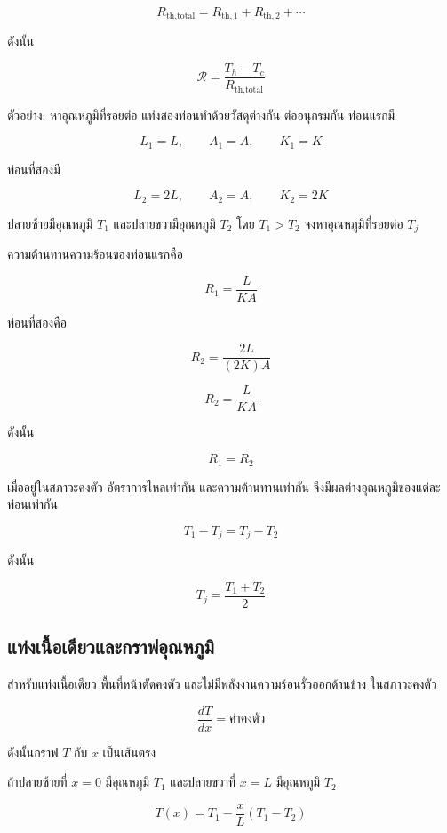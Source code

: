 \[
R_{\text{th,total}}
=
R_{\text{th},1}
+
R_{\text{th},2}
+\cdots
\]

ดังนั้น

\[
\mathcal{R}
=
\frac{T_h-T_c}{R_{\text{th,total}}}
\]

\begin{examplebox}{ตัวอย่าง: หาอุณหภูมิที่รอยต่อ}
แท่งสองท่อนทำด้วยวัสดุต่างกัน ต่ออนุกรมกัน ท่อนแรกมี

\[
L_1=L,\qquad A_1=A,\qquad K_1=K
\]

ท่อนที่สองมี

\[
L_2=2L,\qquad A_2=A,\qquad K_2=2K
\]

ปลายซ้ายมีอุณหภูมิ $T_1$ และปลายขวามีอุณหภูมิ $T_2$ โดย $T_1>T_2$ จงหาอุณหภูมิที่รอยต่อ $T_j$

ความต้านทานความร้อนของท่อนแรกคือ

\[
R_1=\frac{L}{KA}
\]

ท่อนที่สองคือ

\[
R_2=\frac{2L}{(2K)A}
\]

\[
R_2=\frac{L}{KA}
\]

ดังนั้น

\[
R_1=R_2
\]

เมื่ออยู่ในสภาวะคงตัว อัตราการไหลเท่ากัน และความต้านทานเท่ากัน จึงมีผลต่างอุณหภูมิของแต่ละท่อนเท่ากัน

\[
T_1-T_j=T_j-T_2
\]

ดังนั้น

\[
\boxed{T_j=\frac{T_1+T_2}{2}}
\]
\end{examplebox}

\subsection{แท่งเนื้อเดียวและกราฟอุณหภูมิ}

สำหรับแท่งเนื้อเดียว พื้นที่หน้าตัดคงตัว และไม่มีพลังงานความร้อนรั่วออกด้านข้าง ในสภาวะคงตัว

\[
\frac{dT}{dx}=\text{ค่าคงตัว}
\]

ดังนั้นกราฟ $T$ กับ $x$ เป็นเส้นตรง

ถ้าปลายซ้ายที่ $x=0$ มีอุณหภูมิ $T_1$ และปลายขวาที่ $x=L$ มีอุณหภูมิ $T_2$

\[
\boxed{
T(x)=T_1-\frac{x}{L}(T_1-T_2)
}
\]

